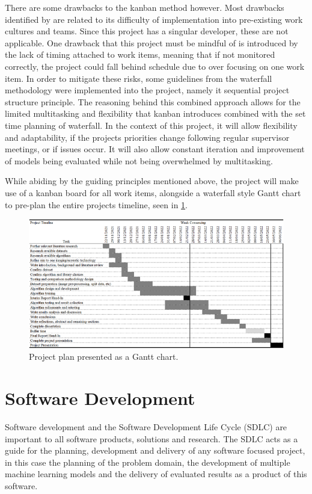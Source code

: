 There are some drawbacks to the kanban method however. Most drawbacks identified by \cite{ahmad2013kanban} are related to its difficulty of implementation into pre-existing work cultures and teams. Since this project has a singular developer, these are not applicable. One drawback that this project must be mindful of is introduced by the lack of timing attached to work items, meaning that if not monitored correctly, the project could fall behind schedule due to over focusing on one work item. In order to mitigate these risks, some guidelines from the waterfall methodology were implemented into the project, namely it sequential project structure principle. The reasoning behind this combined approach allows for the limited multitasking and flexibility that kanban introduces combined with the set time planning of waterfall. In the context of this project, it will allow flexibility and adaptability, if the projects priorities change following regular supervisor meetings, or if issues occur. It will also allow constant iteration and improvement of models being evaluated while not being overwhelmed by multitasking.

While abiding by the guiding principles mentioned above, the project will make use of a kanban board for all work items, alongside a waterfall style Gantt chart to pre-plan the entire projects timeline, seen in \ref{fig:gantt-chart}.

\begin{figure}[H]
    \centering
    \includegraphics[width=\textwidth]{figures/gantt-chart.png}
    \caption{Project plan presented as a Gantt chart.}
    \label{fig:gantt-chart}
\end{figure}

\section{Software Development}
Software development and the Software Development Life Cycle (SDLC) are important to all software products, solutions and research. The SDLC acts as a guide for the planning, development and delivery of any software focused project, in this case the planning of the problem domain, the development of multiple machine learning models and the delivery of evaluated results as a product of this software.

